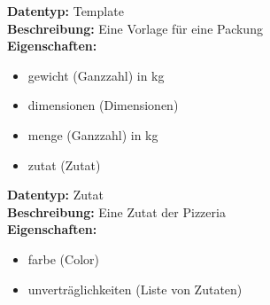 \bigskip
\textbf{Datentyp:} Template\\
\textbf{Beschreibung:} Eine Vorlage für eine Packung\\
\textbf{Eigenschaften:}
\begin{itemize}
    \setlength\itemsep{0em}
    \item gewicht (Ganzzahl) in kg
    \item dimensionen (Dimensionen)
    \item menge (Ganzzahl) in kg
    \item zutat (Zutat)
\end{itemize}
\bigskip
\textbf{Datentyp:} Zutat\\
\textbf{Beschreibung:} Eine Zutat der Pizzeria\\
\textbf{Eigenschaften:}
\begin{itemize}
    \setlength\itemsep{0em}
    \item farbe (Color)
    \item unverträglichkeiten (Liste von Zutaten)
\end{itemize}